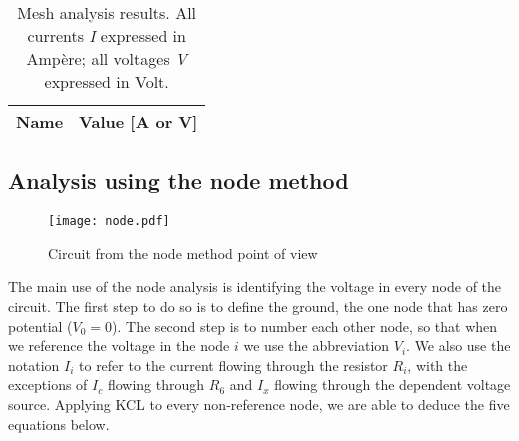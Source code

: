 \begin{table}[h]                             
\centering                                  %
\def\arraystretch{1.2}                       %

\begin{tabular}{c|c}                    %
\hline                                  %

\textbf{Name}  & \textbf{Value [A or V]}\\
\hline                                %

\hline                                %
\end{tabular}   
\caption{Mesh analysis results. All currents \textit{I} expressed in Ampère; all voltages \textit{V} expressed in Volt.}
\label{tab_2}  
\end{table}                             


\begin{comment}
\begin{table}[h]
  \centering
  \begin{tabular}{|l|r|}
    \hline    
    {\bf Name} & {\bf Value [A or V]} \\ \hline
    
  \end{tabular}
  \caption{Mesh analysis results. All currents \textit{I} expressed in Ampère; all voltages \textit{V} expressed in Volt.}
  \label{tab:op}
\end{table}
\end{comment}
\FloatBarrier

\subsection{Analysis using the node method}
\begin{figure}[!htp] \centering
\texttt{[image: node.pdf]}
\caption{Circuit from the node method point of view}
\label{fig3}
\end{figure}
\FloatBarrier

The main use of the node analysis is identifying the voltage in every node of the circuit. The first step to do so is to define the ground, the one node that has zero potential ($V_0=0$). The second step is to number each other node, so that when we reference the voltage in the node $i$ we use the abbreviation $V_i$. We also use the notation $I_i$ to refer to the current flowing through the resistor $R_i$, with the exceptions of $I_c$ flowing through $R_6$ and $I_x$ flowing through the dependent voltage source. Applying KCL to every non-reference node, we are able to deduce the five equations below.

